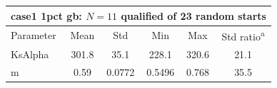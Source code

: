 \begin{tabular}{lccccc}
\toprule
\multicolumn{6}{l}{case1 1pct gb: $N=11$ qualified of 23 random starts} \\
\midrule
Parameter & Mean & Std & Min & Max & Std ratio\textsuperscript{a} \\
\midrule
  KsAlpha & \num{301.8} & \num{35.1} & \num{228.1} & \num{320.6} & \num{21.1} \\
  m & \num{0.59} & \num{0.0772} & \num{0.5496} & \num{0.768} & \num{35.5} \\
\bottomrule
\end{tabular}
